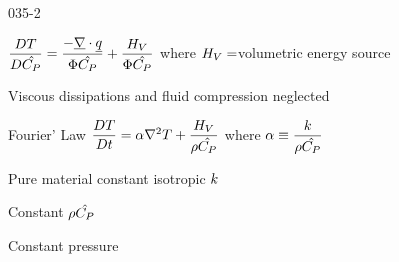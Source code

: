 \begin{mitframe}{035-2}


\begin{listone}

\item $\dfrac{\elecdisplace\Temp}{\elecdisplace\hat{\cp}}=\dfrac{-\gradop\cdot\uline{\heatflux}}{\diss\hat{\cp}}+\dfrac{\enthalpy_{\vol}}{\diss\hat{\cp}}$ where $\enthalpy_{\vol}=$volumetric energy source

\begin{listtwo}

\item Viscous dissipations and fluid compression neglected

	\item Fourier' Law $\dfrac{\elecdisplace\Temp}{\elecdisplace{t}}=\tdiff\nabla^{2}\Temp+\dfrac{\enthalpy_{\vol}}{\dens\hat{\cp}}$ where $\tdiff\equiv\dfrac{\thermcond}{\dens\hat{\cp}}$
    
    			\begin{listthree} 
                
                      \item Pure material constant isotropic $\thermcond$
                      
                     \item Constant $\dens\hat{\cp}$
                     
                			\begin{listfour}
                            
                                \item Constant pressure
							
                            \end{listfour}
				
                \end{listthree}
		
        \end{listtwo}

\end{listone}
\end{mitframe}